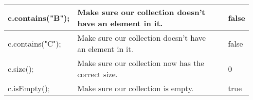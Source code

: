 \documentclass[12pt]{article}
\begin{document}
\begin{table}[htbp]
\begin{center}
{\begin{tabular}{ | l | p{5cm} | p{5cm} | p{5cm} | }
c.contains("B"); &
Make sure our collection doesn't have an element in it. &
&
false \\
\hline

c.contains("C"); &
Make sure our collection doesn't have an element in it. &
&
false \\
\hline

c.size(); &
Make sure our collection now has the correct size. &
&
0 \\
\hline

c.isEmpty(); &
Make sure our collection is empty. &
&
true \\
\hline

\end{tabular}

}
\end{center}
\end{table}
\end{document}
